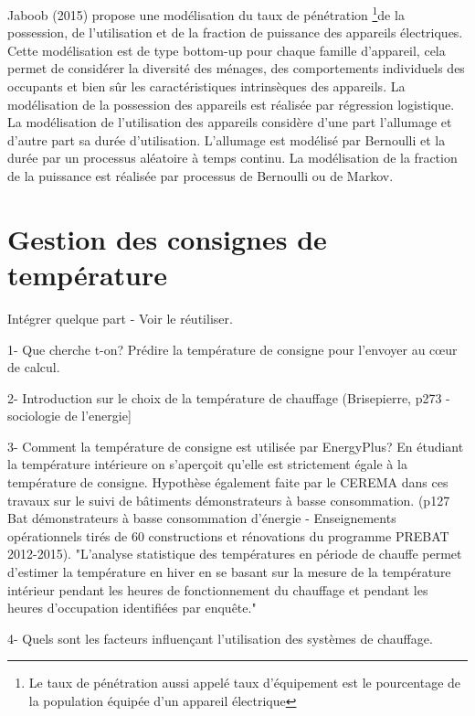 Jaboob (2015) propose une modélisation du taux de pénétration \footnote{Le taux de pénétration aussi appelé taux d'équipement est le pourcentage de la population équipée d'un appareil électrique}de la possession, de l'utilisation et de la fraction de puissance des appareils électriques. Cette modélisation est de type bottom-up pour chaque famille d'appareil, cela permet de considérer la diversité des ménages, des comportements individuels des occupants et bien sûr les caractéristiques intrinsèques des appareils. La modélisation de la possession des appareils est réalisée par régression logistique. La modélisation de l'utilisation des appareils considère d'une part l'allumage et d'autre part sa durée d'utilisation. L'allumage est modélisé par Bernoulli et la durée par un processus aléatoire à temps continu. La modélisation de la fraction de la puissance est réalisée par processus de Bernoulli ou de Markov.

\section{Gestion des consignes de température}

Intégrer quelque part \cite{d'Oca-14} - Voir le réutiliser.

1- Que cherche t-on? Prédire la température de consigne pour l'envoyer au cœur de calcul.

2- Introduction sur le choix de la température de chauffage (Brisepierre, p273 - sociologie de l'energie]

3- Comment la température de consigne est utilisée par EnergyPlus? En étudiant la température intérieure on s'aperçoit qu'elle est strictement égale à la température de consigne. Hypothèse également faite par le CEREMA dans ces travaux sur le suivi de bâtiments démonstrateurs à basse consommation. (p127  Bat démonstrateurs à basse consommation d'énergie - Enseignements opérationnels tirés de 60 constructions et rénovations du programme PREBAT 2012-2015). "L'analyse statistique des températures en période de chauffe permet d'estimer la température en hiver en se basant sur la mesure de la température intérieur pendant les heures de fonctionnement du chauffage et pendant les heures d'occupation identifiées par enquête."

4- Quels sont les facteurs influençant l'utilisation des systèmes de chauffage.

